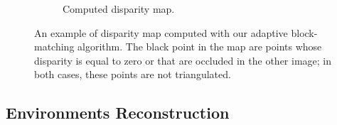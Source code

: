 \begin{figure}[h]
\begin{subfigure}{0.7\linewidth}
		\caption{Computed disparity map.}
	\end{subfigure}
\caption{An example of disparity map computed with our adaptive block-matching
algorithm. The black point in the map are points whose disparity is equal to
zero or that are occluded in the other image; in both cases, these points are
not triangulated.}
\label{fig:llDisparity}
\end{figure}

\subsection{Environments Reconstruction}
